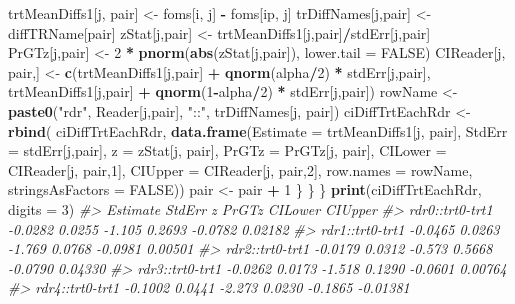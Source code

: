 \documentclass[
]{book}
\newenvironment{Shaded}{\begin{snugshade}}{\end{snugshade}}
\newcommand{\CommentTok}[1]{\textcolor[rgb]{0.56,0.35,0.01}{\textit{#1}}}
\newcommand{\DataTypeTok}[1]{\textcolor[rgb]{0.13,0.29,0.53}{#1}}
\newcommand{\DecValTok}[1]{\textcolor[rgb]{0.00,0.00,0.81}{#1}}
\newcommand{\KeywordTok}[1]{\textcolor[rgb]{0.13,0.29,0.53}{\textbf{#1}}}
\newcommand{\NormalTok}[1]{#1}
\newcommand{\OperatorTok}[1]{\textcolor[rgb]{0.81,0.36,0.00}{\textbf{#1}}}
\newcommand{\OtherTok}[1]{\textcolor[rgb]{0.56,0.35,0.01}{#1}}
\newcommand{\StringTok}[1]{\textcolor[rgb]{0.31,0.60,0.02}{#1}}
\begin{document}
\begin{Shaded}
\begin{Highlighting}[]
\NormalTok{      trtMeanDiffs1[j, pair] \textless{}{-}}\StringTok{ }\NormalTok{foms[i, j] }\OperatorTok{{-}}\StringTok{ }\NormalTok{foms[ip, j]}
\NormalTok{      trDiffNames[j,pair] \textless{}{-}}\StringTok{ }\NormalTok{diffTRName[pair]}
\NormalTok{      zStat[j,pair] \textless{}{-}}\StringTok{ }\NormalTok{trtMeanDiffs1[j,pair]}\OperatorTok{/}\NormalTok{stdErr[j,pair]}
\NormalTok{      PrGTz[j,pair] \textless{}{-}}\StringTok{ }
\StringTok{        }\DecValTok{2} \OperatorTok{*}\StringTok{ }\KeywordTok{pnorm}\NormalTok{(}\KeywordTok{abs}\NormalTok{(zStat[j,pair]), }\DataTypeTok{lower.tail =} \OtherTok{FALSE}\NormalTok{)}
\NormalTok{      CIReader[j, pair,] \textless{}{-}}\StringTok{ }
\StringTok{        }\KeywordTok{c}\NormalTok{(trtMeanDiffs1[j,pair] }\OperatorTok{+}\StringTok{ }
\StringTok{            }\KeywordTok{qnorm}\NormalTok{(alpha}\OperatorTok{/}\DecValTok{2}\NormalTok{) }\OperatorTok{*}\StringTok{ }\NormalTok{stdErr[j,pair], }
\NormalTok{          trtMeanDiffs1[j,pair] }\OperatorTok{+}\StringTok{ }
\StringTok{            }\KeywordTok{qnorm}\NormalTok{(}\DecValTok{1}\OperatorTok{{-}}\NormalTok{alpha}\OperatorTok{/}\DecValTok{2}\NormalTok{) }\OperatorTok{*}\StringTok{ }\NormalTok{stdErr[j,pair])}
\NormalTok{      rowName \textless{}{-}}\StringTok{ }
\StringTok{        }\KeywordTok{paste0}\NormalTok{(}\StringTok{"rdr"}\NormalTok{, Reader[j,pair], }\StringTok{"::"}\NormalTok{, trDiffNames[j, pair])}
\NormalTok{      ciDiffTrtEachRdr \textless{}{-}}\StringTok{ }\KeywordTok{rbind}\NormalTok{(}
\NormalTok{        ciDiffTrtEachRdr, }
        \KeywordTok{data.frame}\NormalTok{(}\DataTypeTok{Estimate =}\NormalTok{ trtMeanDiffs1[j, pair], }
                   \DataTypeTok{StdErr =}\NormalTok{ stdErr[j,pair], }
                   \DataTypeTok{z =}\NormalTok{ zStat[j, pair], }
                   \DataTypeTok{PrGTz =}\NormalTok{ PrGTz[j, pair], }
                   \DataTypeTok{CILower =}\NormalTok{ CIReader[j, pair,}\DecValTok{1}\NormalTok{],}
                   \DataTypeTok{CIUpper =}\NormalTok{ CIReader[j, pair,}\DecValTok{2}\NormalTok{],}
                   \DataTypeTok{row.names =}\NormalTok{ rowName,}
                   \DataTypeTok{stringsAsFactors =} \OtherTok{FALSE}\NormalTok{))}
\NormalTok{      pair \textless{}{-}}\StringTok{ }\NormalTok{pair }\OperatorTok{+}\StringTok{ }\DecValTok{1}
\NormalTok{    \}}
\NormalTok{  \}}
\NormalTok{\}}
\KeywordTok{print}\NormalTok{(ciDiffTrtEachRdr, }\DataTypeTok{digits =} \DecValTok{3}\NormalTok{)}
\CommentTok{\#\textgreater{}                 Estimate StdErr      z  PrGTz CILower  CIUpper}
\CommentTok{\#\textgreater{} rdr0::trt0{-}trt1  {-}0.0282 0.0255 {-}1.105 0.2693 {-}0.0782  0.02182}
\CommentTok{\#\textgreater{} rdr1::trt0{-}trt1  {-}0.0465 0.0263 {-}1.769 0.0768 {-}0.0981  0.00501}
\CommentTok{\#\textgreater{} rdr2::trt0{-}trt1  {-}0.0179 0.0312 {-}0.573 0.5668 {-}0.0790  0.04330}
\CommentTok{\#\textgreater{} rdr3::trt0{-}trt1  {-}0.0262 0.0173 {-}1.518 0.1290 {-}0.0601  0.00764}
\CommentTok{\#\textgreater{} rdr4::trt0{-}trt1  {-}0.1002 0.0441 {-}2.273 0.0230 {-}0.1865 {-}0.01381}
\end{Highlighting}
\end{Shaded}
\end{document}
